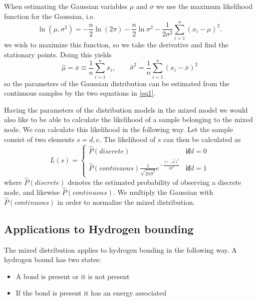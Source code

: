 \documentclass[10pt, journal, compsoc, a4paper]{IEEEtran}
\begin{document}
When estimating the Gaussian variables $\mu$ and $\sigma$ we use the maximum likelihood function for the Gaussian, i.e.
\begin{equation}
  \ln(\mu, \sigma^2) = -\frac{n}{2}\ln(2\pi) - \frac{n}{2}\ln\sigma^2 - \frac{1}{2\sigma^2}\sum_{i=1}^n (x_i-\mu)^2.
\end{equation}
we wish to maximize this function, so we take the derivative and find the stationary points. Doing this yields
\begin{equation}
  \hat{\mu} = \overline{x} \equiv \frac{1}{n}\sum_{i=1}^n x_i, \qquad \hat{\sigma}^2 = \frac{1}{n} \sum_{i=1}^n (x_i - \overline{x})^2
  \label{eq1}
\end{equation}
so the parameters of the Gaussian distribution can be estimated from the continuous samples by the two equations in \ref{eq1}. 


Having the parameters of the distribution models in the mixed model we would also like to be able to calculate the likelihood of a sample belonging to the mixed node. We can calculate this likelihood in the following way. Let the sample consist of two elements $s = {d, e}$. The likelihood of $s$ can then be calculated as
\begin{equation} 
L(s) = 
\left\{
\begin{array}{ll} 
  \hat{P}(discrete) & \mathbf{if } d = 0  \\
  \hat{P}(continuous) \frac{1}{\sqrt{2\pi\hat{\sigma}^2}} e^{ -\frac{(e-\hat{\mu})^2}{2\hat{\sigma}^2} }  & \mathbf{if } d = 1    
  \label{eq6}
\end{array} 
\right. 
\end{equation} 
where $\hat{P}(discrete)$ denotes the estimated probability of observing a discrete node, and likewise $\hat{P}(continuous)$. We multiply the Gaussian with $\hat{P}(continuous)$ in order to normalize the mixed distribution.


\subsection{Applications to Hydrogen bounding} %
\label{sub:applications_to_hydrogen_bounding}
The mixed distribution applies to hydrogen bonding in the following way. A hydrogen bound has two states:

\begin{itemize}
  \item A bond is present or it is not present
  \item If the bond is present it has an energy associated
\end{itemize}
\end{document}
